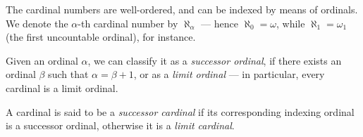 The cardinal numbers are well-ordered, and can be indexed by means of
ordinals. We denote the \(\alpha\)-th cardinal number by \(\aleph_{\alpha}\) ---
hence \(\aleph_0 = \omega\), while \(\aleph_1 = \omega_1\) (the first
uncountable ordinal), for instance.

\begin{definition}
    \label{def:successor-limit-ordinal}
    Given an ordinal \(\alpha\), we can classify it as a \emph{successor ordinal},
    if there exists an ordinal \(\beta\) such that \(\alpha = \beta + 1\), or as a
    \emph{limit ordinal} --- in particular, every cardinal is a limit ordinal.
\end{definition}

\begin{definition}
    \label{def:successor-limit-cardinal}
    A cardinal is said to be a \emph{successor cardinal} if its corresponding
    indexing ordinal is a successor ordinal, otherwise it is a \emph{limit
        cardinal}.
\end{definition}


